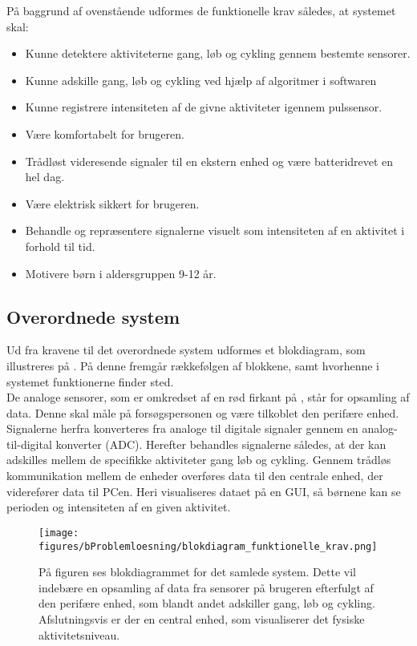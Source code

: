 På baggrund af ovenstående udformes de funktionelle krav således, at systemet skal: 
\begin{itemize}
	\item Kunne detektere aktiviteterne gang, løb og cykling gennem bestemte sensorer.
	\item Kunne adskille gang, løb og cykling ved hjælp af algoritmer i softwaren 
	\item Kunne registrere intensiteten af de givne aktiviteter igennem pulssensor.
	\item Være komfortabelt for brugeren.
	\item Trådløst videresende signaler til en ekstern enhed og være batteridrevet en hel dag.
	\item Være elektrisk sikkert for brugeren.
	\item Behandle og repræsentere signalerne visuelt som intensiteten af en aktivitet i forhold til tid.
	\item Motivere børn i aldersgruppen 9-12 år. 
\end{itemize}

\subsection{Overordnede system}
Ud fra kravene til det overordnede system udformes et blokdiagram, som illustreres på . På denne fremgår rækkefølgen af blokkene, samt hvorhenne i systemet funktionerne finder sted.\\
De analoge sensorer, som er omkredset af en rød firkant på , står for opsamling af data. Denne skal måle på forsøgspersonen og være tilkoblet den perifære enhed. Signalerne herfra konverteres fra analoge til digitale signaler gennem en analog-til-digital konverter (ADC). Herefter behandles signalerne således, at der kan adskilles mellem de specifikke aktiviteter gang løb og cykling. Gennem trådløs kommunikation mellem de enheder overføres data til den centrale enhed, der viderefører data til PCen. Heri visualiseres dataet på en GUI, så børnene kan se perioden og intensiteten af en given aktivitet. 
\begin{figure}[H]
 	\centering
 	\texttt{[image: figures/bProblemloesning/blokdiagram\_funktionelle\_krav.png]}
 	\caption{På figuren ses blokdiagrammet for det samlede system. Dette vil indebære en opsamling af data fra sensorer på brugeren efterfulgt af den perifære enhed, som blandt andet adskiller gang, løb og cykling. Afslutningsvis er der en central enhed, som visualiserer det fysiske aktivitetsniveau.}
 	\label{fig:blokdiagram}
 \end{figure}